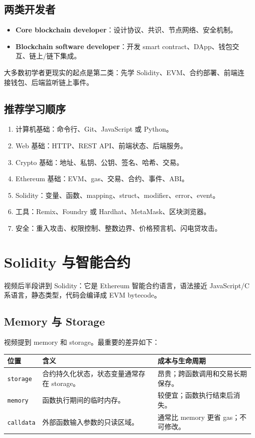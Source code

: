 \documentclass[UTF8,11pt]{ctexart}
\newcommand{\term}[1]{\textbf{\sffamily #1}}
\begin{document}
\subsection{两类开发者}

\begin{itemize}
  \item \term{Core blockchain developer}：设计协议、共识、节点网络、安全机制。
  \item \term{Blockchain software developer}：开发 smart contract、DApp、钱包交互、链上/链下集成。
\end{itemize}

大多数初学者更现实的起点是第二类：先学 Solidity、EVM、合约部署、前端连接钱包、后端监听链上事件。

\subsection{推荐学习顺序}

\begin{enumerate}
  \item 计算机基础：命令行、Git、JavaScript 或 Python。
  \item Web 基础：HTTP、REST API、前端状态、后端服务。
  \item Crypto 基础：地址、私钥、公钥、签名、哈希、交易。
  \item Ethereum 基础：EVM、gas、交易、合约、事件、ABI。
  \item Solidity：变量、函数、mapping、struct、modifier、error、event。
  \item 工具：Remix、Foundry 或 Hardhat、MetaMask、区块浏览器。
  \item 安全：重入攻击、权限控制、整数边界、价格预言机、闪电贷攻击。
\end{enumerate}

\section{Solidity 与智能合约}
\label{sec:solidity}

视频后半段讲到 Solidity：它是 Ethereum 智能合约语言，语法接近 JavaScript/C 系语言，静态类型，代码会编译成 EVM bytecode。

\subsection{Memory 与 Storage}

视频提到 memory 和 storage。最重要的差异如下：

\begin{longtable}{>{\raggedright\arraybackslash}p{3cm}>{\raggedright\arraybackslash}p{5.8cm}>{\raggedright\arraybackslash}p{5.8cm}}
\toprule
\textbf{位置} & \textbf{含义} & \textbf{成本与生命周期} \\
\midrule
\endhead
\texttt{storage} & 合约持久化状态，状态变量通常存在 storage。 & 昂贵；跨函数调用和交易长期保存。 \\
\texttt{memory} & 函数执行期间的临时内存。 & 较便宜；函数执行结束后消失。 \\
\texttt{calldata} & 外部函数输入参数的只读区域。 & 通常比 memory 更省 gas；不可修改。 \\
\bottomrule
\end{longtable}
\end{document}
